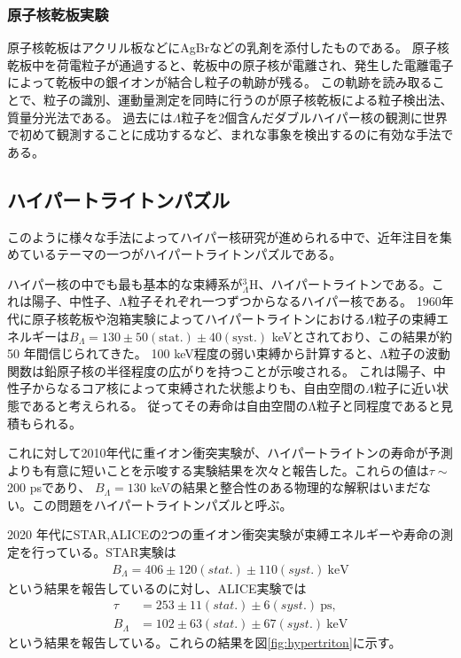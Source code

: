 \documentclass[a4paper,11pt,uplatex]{jsbook}
\begin{document}
\subsubsection{原子核乾板実験}
原子核乾板はアクリル板などにAgBrなどの乳剤を添付したものである。
原子核乾板中を荷電粒子が通過すると、乾板中の原子核が電離され、発生した電離電子によって乾板中の銀イオンが結合し粒子の軌跡が残る。
この軌跡を読み取ることで、粒子の識別、運動量測定を同時に行うのが原子核乾板による粒子検出法、質量分光法である。
過去には$\Lambda$粒子を2個含んだダブルハイパー核の観測に世界で初めて観測することに成功するなど\cite{takahashi2001}、まれな事象を検出するのに有効な手法である。

\subsection{ハイパートライトンパズル}\label{sec:hypertriton puzzle}
このように様々な手法によってハイパー核研究が進められる中で、近年注目を集めているテーマの一つがハイパートライトンパズルである。

ハイパー核の中でも最も基本的な束縛系が$^3_{\Lambda}\text{H}$、ハイパートライトンである。これは陽子、中性子、Λ粒子それぞれ一つずつからなるハイパー核である。
1960年代に原子核乾板や泡箱実験によってハイパートライトンにおける$\Lambda$粒子の束縛エネルギーは$B_{\Lambda} = 130 \pm 50(\text{stat.}) \pm 40(\text{syst.})$ keVとされており\cite{Juric}、この結果が約50 年間信じられてきた。
100 keV程度の弱い束縛から計算すると、Λ粒子の波動関数は鉛原子核の半径程度の広がりを持つことが示唆される。
これは陽子、中性子からなるコア核によって束縛された状態よりも、自由空間の$\Lambda$粒子に近い状態であると考えられる。%
従ってその寿命は自由空間のΛ粒子と同程度であると見積もられる。

これに対して2010年代に重イオン衝突実験が、ハイパートライトンの寿命が予測よりも有意に短いことを示唆する実験結果を次々と報告した\cite{HI-1,HI-2,HI-3,HI-4}。これらの値は$\tau \sim$200 psであり、
$B_{\Lambda} = 130$ keVの結果と整合性のある物理的な解釈はいまだない。この問題をハイパートライトンパズルと呼ぶ。

2020 年代にSTAR,ALICEの2つの重イオン衝突実験が束縛エネルギーや寿命の測定を行っている。STAR実験\cite{STAR}は
\begin{align*}
  B_{\Lambda} = 406 \pm 120(stat.) \pm 110 (syst.) ~\text{keV}
\end{align*}
という結果を報告しているのに対し、ALICE実験\cite{ALICE}では
\begin{align*}
  \tau        &= 253 \pm 11(stat.) \pm 6(syst.) ~\text{ps},\\
  B_{\Lambda} &= 102 \pm 63(stat.) \pm 67(syst.) ~\text{keV}
\end{align*}
という結果を報告している。これらの結果を図\ref{fig:hypertriton}に示す。
\end{document}
